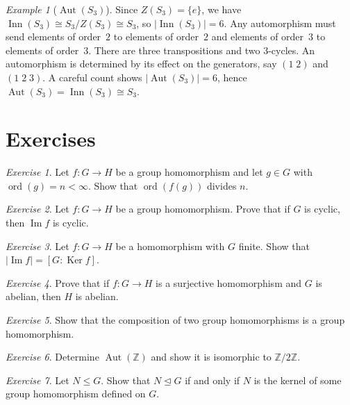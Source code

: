 \documentclass[12pt,a4paper,openany]{book}
\theoremstyle{definition}
\theoremstyle{remark}
\newtheorem{example}{Example}[chapter]
\newtheorem{exercise}{Exercise}[chapter]
\newcommand{\Z}{\mathbb{Z}}
\DeclareMathOperator{\Aut}{Aut}
\DeclareMathOperator{\Inn}{Inn}
\DeclareMathOperator{\Ker}{Ker}
\DeclareMathOperator{\im}{Im}
\DeclareMathOperator{\ord}{ord}
\begin{document}
\begin{example}[$\Aut(S_3)$]\label{ex:aut-S3}
Since $Z(S_3)=\{e\}$, we have $\Inn(S_3)\cong S_3/Z(S_3)\cong S_3$, so
$|\Inn(S_3)|=6$.  Any automorphism must send elements of order~$2$ to
elements of order~$2$ and elements of order~$3$ to elements of
order~$3$.  There are three transpositions and two $3$-cycles.
An automorphism is determined by its effect on the generators, say
$(1\;2)$ and $(1\;2\;3)$.  A careful count shows $|\Aut(S_3)|=6$,
hence $\Aut(S_3)=\Inn(S_3)\cong S_3$.
\end{example}

\section{Exercises}\label{sec:ch3-exercises}

\begin{exercise}\label{exo:hom-order-divides}
Let $f\colon G\to H$ be a group homomorphism and let $g\in G$ with
$\ord(g)=n<\infty$.  Show that $\ord(f(g))$ divides $n$.
\end{exercise}

\begin{exercise}\label{exo:hom-cyclic-image}
Let $f\colon G\to H$ be a group homomorphism.  Prove that if $G$ is
cyclic, then $\im f$ is cyclic.
\end{exercise}

\begin{exercise}\label{exo:ker-index}
Let $f\colon G\to H$ be a homomorphism with $G$ finite.  Show that
$|\im f| = [G:\Ker f]$.
\end{exercise}

\begin{exercise}\label{exo:hom-abelian-image}
Prove that if $f\colon G\to H$ is a surjective homomorphism and $G$ is
abelian, then $H$ is abelian.
\end{exercise}

\begin{exercise}\label{exo:hom-composition}
Show that the composition of two group homomorphisms is a group
homomorphism.
\end{exercise}

\begin{exercise}\label{exo:aut-cyclic-inf}
Determine $\Aut(\Z)$ and show it is isomorphic to $\Z/2\Z$.
\end{exercise}

\begin{exercise}\label{exo:normal-iff-ker}
Let $N\le G$.  Show that $N\trianglelefteq G$ if and only if $N$ is the
kernel of some group homomorphism defined on $G$.
\end{exercise}
\end{document}
